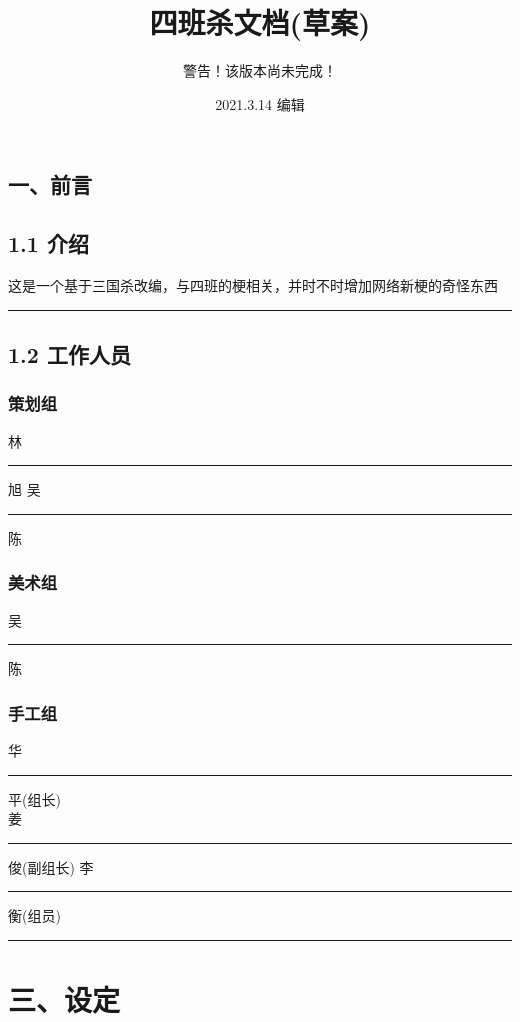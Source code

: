 \documentclass[UTF-8]{ctexart}
\title{四班杀文档(草案)}
\author{警告！该版本尚未完成！}
\date{2021.3.14 \space 编辑}
\begin{document}
\maketitle
\thispagestyle{empty}
\newpage

\begin{center}
\section*{一、前言}
\end{center}

\subsection*{1.1    介绍}
这是一个基于三国杀改编，与四班的梗相关，并时不时增加网络新梗的奇怪东西

{\noindent} \rule[-10pt]{33em}{0.05em}
\begin{center}
\subsection*{1.2    工作人员}

    \subsubsection*{策划组}
    林\rule[-2pt]{1em}{1em}旭 \hspace{1.0cm} 吴\rule[-2pt]{1em}{1em}陈
    \subsubsection*{美术组}
    吴\rule[-2pt]{1em}{1em}陈
    \subsubsection*{手工组}
    华\rule[-2pt]{1em}{1em}平(组长) \\ 姜\rule[-2pt]{1em}{1em}俊(副组长) \hspace{1.0cm} 李\rule[-2pt]{1em}{1em}衡(组员)

\end{center}
{\noindent} \rule[-10pt]{33em}{0.05em}

\newpage

\section*{三、设定}
\end{document}
